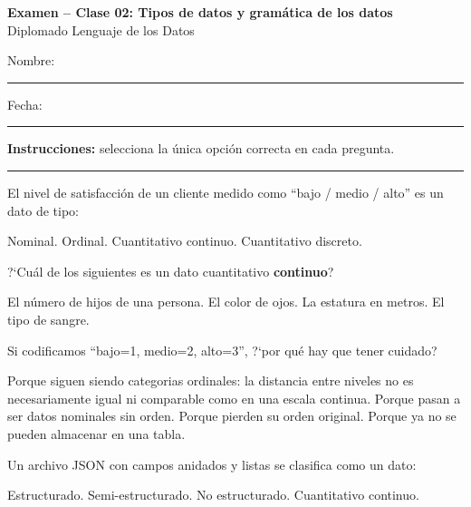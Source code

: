 \documentclass[12pt,addpoints]{exam}
\begin{document}
\begin{center}
  {\color{molMorado}\Large\bfseries Examen -- Clase 02:
   Tipos de datos y gram\'atica de los datos}\\[3pt]
  {\color{molTeal}\large Diplomado Lenguaje de los Datos}
\end{center}

\vspace{6pt}
\noindent Nombre: \rule{6cm}{0.4pt} \hfill Fecha: \rule{3cm}{0.4pt}

\vspace{6pt}
\noindent\textbf{Instrucciones:} selecciona la \'unica opci\'on correcta en cada
pregunta.

\vspace{4pt}
\hrule
\vspace{8pt}

\begin{questions}

\question[1] El nivel de satisfacci\'on de un cliente medido como
``bajo / medio / alto'' es un dato de tipo:
\begin{choices}
  \choice Nominal.
  \CorrectChoice Ordinal.
  \choice Cuantitativo continuo.
  \choice Cuantitativo discreto.
\end{choices}

\question[1] ?`Cu\'al de los siguientes es un dato cuantitativo \textbf{continuo}?
\begin{choices}
  \choice El n\'umero de hijos de una persona.
  \choice El color de ojos.
  \CorrectChoice La estatura en metros.
  \choice El tipo de sangre.
\end{choices}

\question[1] Si codificamos ``bajo=1, medio=2, alto=3'', ?`por qu\'e hay que
tener cuidado?
\begin{choices}
  \CorrectChoice Porque siguen siendo categorias ordinales: la distancia entre
    niveles no es necesariamente igual ni comparable como en una escala continua.
  \choice Porque pasan a ser datos nominales sin orden.
  \choice Porque pierden su orden original.
  \choice Porque ya no se pueden almacenar en una tabla.
\end{choices}

\question[1] Un archivo JSON con campos anidados y listas se clasifica como un
dato:
\begin{choices}
  \choice Estructurado.
  \CorrectChoice Semi-estructurado.
  \choice No estructurado.
  \choice Cuantitativo continuo.
\end{choices}


\end{questions}
\end{document}
